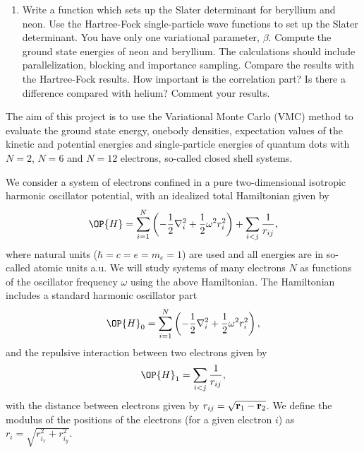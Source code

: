 \begin{prob}
\begin{enumerate}
\item   Write a function which sets up the Slater determinant for beryllium and neon. 
Use the Hartree-Fock single-particle wave functions to set up the Slater determinant.
You have only one variational parameter, $\beta$.
Compute the ground state energies of neon  and beryllium. 
The calculations should include  parallelization, blocking and importance sampling.  Compare the results with the Hartree-Fock
results.  How important is the correlation part?  Is there a difference compared with helium?   
Comment your results.

\end{enumerate}

\end{prob}

\begin{prob}

The aim of this project is to use the Variational Monte
Carlo (VMC) method to evaluate 
the ground state energy, onebody densities, expectation values of the kinetic and potential energies  and single-particle energies of 
quantum dots with $N=2$, $N=6$ and $N=12$ electrons, so-called closed shell systems.


We consider a system of electrons confined in a pure two-dimensional 
isotropic harmonic oscillator potential, with an idealized  total Hamiltonian given by 
\begin{equation}
\label{eq:finalH}
\OP{H}=\sum_{i=1}^{N} \left(  -\frac{1}{2} \nabla_i^2 + \frac{1}{2} \omega^2r_i^2  \right)+\sum_{i<j}\frac{1}{r_{ij}},
\end{equation}
where natural units ($\hbar=c=e=m_e=1$) are used and all energies are in so-called atomic units a.u. We will study systems of many electrons $N$ as functions of the oscillator frequency  $\omega$ using the above Hamiltonian.  The Hamiltonian includes a standard harmonic oscillator part
\[
\OP{H}_0=\sum_{i=1}^{N} \left(  -\frac{1}{2} \nabla_i^2 + \frac{1}{2} \omega^2r_i^2  \right),
\]
and the repulsive interaction between two electrons given by 
\[
\OP{H}_1=\sum_{i<j}\frac{1}{r_{ij}},
\]
with the distance between electrons given by $r_{ij}=\sqrt{{\bf r}_1-{\bf r}_2}$. We define the 
modulus of the positions of the electrons (for a given electron $i$) as $r_i = \sqrt{r_{i_x}^2+r_{i_y}^2}$.


\begin{enumerate}


\end{enumerate}
\end{prob}
